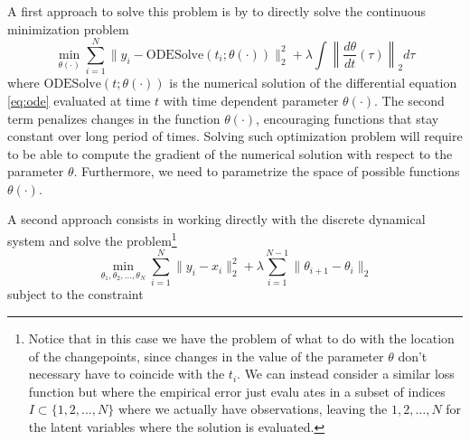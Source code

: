 A first approach to solve this problem is by to directly solve the continuous minimization problem 
\begin{equation}
    \min_{\theta(\cdot)}
    \sum_{i=1}^N
    \| y_i - \text{ODESolve}(t_i; \theta(\cdot)) \|_2^2
    + 
    \lambda 
    \int \left \| \frac{d\theta}{dt}(\tau) \right \|_2 d\tau
\end{equation}
where $\text{ODESolve}(t; \theta(\cdot))$ is the numerical solution of the differential equation \eqref{eq:ode} evaluated at time $t$ with time dependent parameter $\theta(\cdot)$.
The second term penalizes changes in the function $\theta(\cdot)$, encouraging functions that stay constant over long period of times. 
Solving such optimization problem will require to be able to compute the gradient of the numerical solution with respect to the parameter $\theta$. 
Furthermore, we need to parametrize the space of possible functions $\theta(\cdot)$.

A second approach consists in working directly with the discrete dynamical system and solve the problem\footnote{Notice that in this case we have the problem of what to do with the location of the changepoints, since changes in the value of the parameter $\theta$ don't necessary have to coincide with the $t_i$. We can instead consider a similar loss function but where the empirical error just evalu ates in a subset of indices $I \subset \{1 , 2, \ldots, N \}$ where we actually have observations, leaving the $1,2, \ldots, N$ for the latent variables where the solution is evaluated.}
\begin{equation}
    \min_{\theta_1, \theta_2, \ldots, \theta_N}
    \sum_{i=1}^N
    \| y_i - x_i \|_2^2
    + 
    \lambda
    \sum_{i=1}^{N-1}
    \| \theta_{i+1} - \theta_i \|_2
\end{equation}
subject to the constraint 